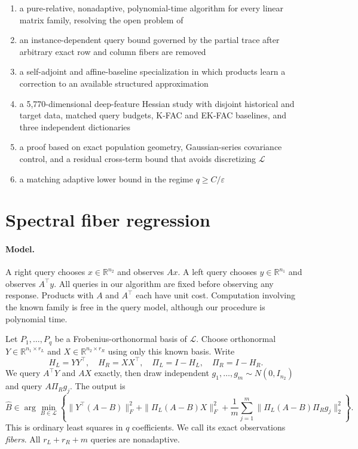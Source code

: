 \documentclass{article}
\theoremstyle{remark}
\newcommand{\cL}{\mathcal L}
\newcommand{\eps}{\varepsilon}
\newcommand{\1}{\mathbf 1}
\begin{document}
\begin{enumerate}
\item a pure-relative, nonadaptive, polynomial-time algorithm for every linear
matrix family, resolving the open problem of \citet{amsel2026query}
\item an instance-dependent query bound governed by the partial trace after
arbitrary exact row and column fibers are removed
\item a self-adjoint and affine-baseline specialization in which products learn
a correction to an available structured approximation
\item a 5,770-dimensional deep-feature Hessian study with disjoint historical
and target data, matched query budgets, K-FAC and EK-FAC baselines, and three independent dictionaries
\item a proof based on exact population geometry, Gaussian-series covariance
control, and a residual cross-term bound that avoids discretizing $\cL$
\item a matching adaptive lower bound in the regime $q\ge C/\eps$
\end{enumerate}

\section{Spectral fiber regression}
\label{sec:algorithm}

\paragraph{Model.}
A right query chooses $x\in\mathbb R^{n_2}$ and observes $Ax$.  A left query chooses $y\in\mathbb R^{n_1}$ and observes $A^\top y$.  All queries in our algorithm are fixed before observing any response.  Products with $A$ and $A^\top$ each have unit cost.  Computation involving the known family is free in the query model, although our procedure is polynomial time.

Let $P_1,\ldots,P_q$ be a Frobenius-orthonormal basis of $\cL$.  Choose orthonormal $Y\in\mathbb R^{n_1\times r_L}$ and $X\in\mathbb R^{n_2\times r_R}$ using only this known basis.  Write \[ H_L=YY^\top,\quad H_R=XX^\top,\quad \Pi_L=I-H_L,\quad \Pi_R=I-H_R. \] We query $A^\top Y$ and $AX$ exactly, then draw independent $g_1,\ldots,g_m\sim N(0,I_{n_2})$ and query $A\Pi_Rg_j$.  The output is
\begin{equation}
 \widehat B\in\arg\min_{B\in\cL}\left\{
 \|Y^\top(A-B)\|_F^2+\|\Pi_L(A-B)X\|_F^2+
 \frac1m\sum_{j=1}^m\|\Pi_L(A-B)\Pi_Rg_j\|_2^2
 \right\}.
 \label{eq:estimator}
\end{equation}
This is ordinary least squares in $q$ coefficients.  We call its exact observations \emph{fibers}.  All $r_L+r_R+m$ queries are nonadaptive.
\end{document}
